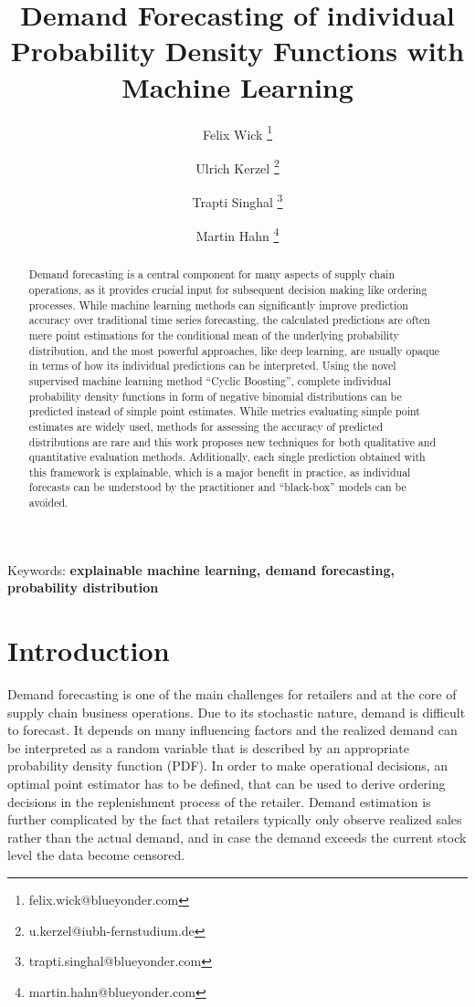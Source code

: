 \documentclass[BCOR=1mm, DIV=calc,10pt,
twoside=true,
twocolumn,
headings=normal]{scrartcl}
\begin{document}
\title{Demand Forecasting of individual Probability Density Functions with Machine Learning}

\author[1]{Felix Wick \thanks{felix.wick@blueyonder.com}}
\author[2]{Ulrich Kerzel \thanks{u.kerzel@iubh-fernstudium.de}}
\author[1]{Trapti Singhal \thanks{trapti.singhal@blueyonder.com}}
\author[1]{Martin Hahn \thanks{martin.hahn@blueyonder.com}}


\date{}

\maketitle

\begin{abstract}
Demand forecasting is a central component for many aspects of supply chain operations, as it provides crucial input for subsequent decision making like ordering processes. While machine learning methods can significantly improve prediction accuracy over traditional time series forecasting, the calculated predictions are often mere point estimations for the conditional mean of the underlying probability distribution, and the most powerful approaches, like deep learning, are usually opaque in terms of how its individual predictions can be interpreted. Using the novel supervised machine learning method ``Cyclic Boosting'', complete individual probability density functions in form of negative binomial distributions can be predicted instead of simple point estimates. While metrics evaluating simple point estimates are widely used, methods for assessing the accuracy of predicted distributions are rare and this work proposes new techniques for both qualitative and quantitative evaluation methods. Additionally, each single prediction obtained with this framework is explainable, which is a major benefit in practice, as individual forecasts can be understood by the practitioner and ``black-box'' models can be avoided. 
\end{abstract}

{Keywords: \textbf{explainable machine learning, demand forecasting, probability distribution}}


\section{Introduction}

Demand forecasting is one of the main challenges for retailers and at the core of supply chain business operations. Due to its stochastic nature, demand is difficult to forecast. It depends on many influencing factors and the realized demand can be interpreted as a random variable that is described by an appropriate probability density function (PDF). In order to make operational decisions, an optimal point estimator has to be defined, that can be used to derive ordering decisions in the replenishment process of the retailer. Demand estimation is further complicated by the fact that retailers typically only observe realized sales rather than the actual demand, and in case the demand exceeds the current stock level the data become censored.
\end{document}
